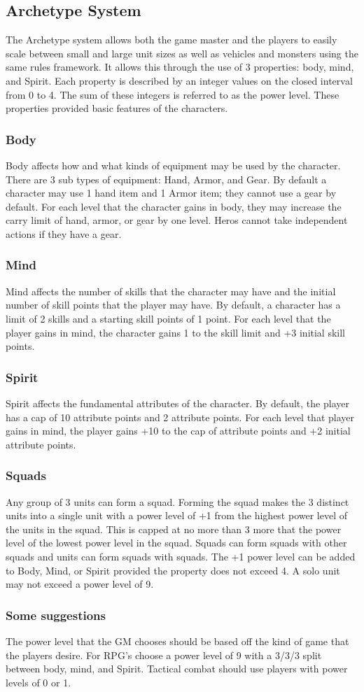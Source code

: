 \subsection{Archetype System}
The Archetype system allows both the game master and the players to easily
scale between small and large unit sizes as well as vehicles and monsters using
the same rules framework. It allows this through the use of 3 properties: body,
mind, and Spirit.  Each property is described by an integer values on the closed
interval from 0 to 4.  The sum of these integers is referred to as the power
level.  These properties provided basic features of the characters.
\subsubsection{Body}
Body affects how and what kinds of equipment may be used by the character.
There are 3 sub types of equipment: Hand, Armor, and Gear.  By default a
character may use 1 hand item and 1 Armor item;  they cannot use a gear by
default.  For each level that the character gains in body, they may increase the
carry limit of hand, armor, or gear by one level.  Heros cannot take
independent actions if they have a gear.
\subsubsection{Mind}
Mind affects the number of skills that the character may have and the initial
number of skill points that the player may have.  By default, a character has a
limit of 2 skills and a starting skill points of 1 point.  For each level that
the player gains in mind, the character gains 1 to the skill limit and +3
initial skill points.
\subsubsection{Spirit}
Spirit affects the fundamental attributes of the character.  By default, the player
has a cap of 10 attribute points and 2 attribute points.  For each level that
player gains in mind, the player gains +10 to the cap of attribute points and +2
initial attribute points.
\subsubsection{Squads}
Any group of 3 units can form a squad.  Forming the squad makes the 3 distinct
units into a single unit with a power level of +1 from the highest power level
of the units in the squad.  This is capped at no more than 3 more that the power
level of the lowest  power level in the squad.  Squads can form squads with
other squads and units can form squads with squads.  The +1 power level can be
added to Body, Mind, or Spirit provided the property does not exceed 4.  A solo
unit may not exceed a power level of 9.
\subsubsection{Some suggestions}
The power level that the GM chooses should be based off the kind of game that
the players desire.  For RPG's choose a power level of 9 with a 3/3/3 split
between body, mind, and Spirit. Tactical combat should use players with power
levels of 0 or 1.
